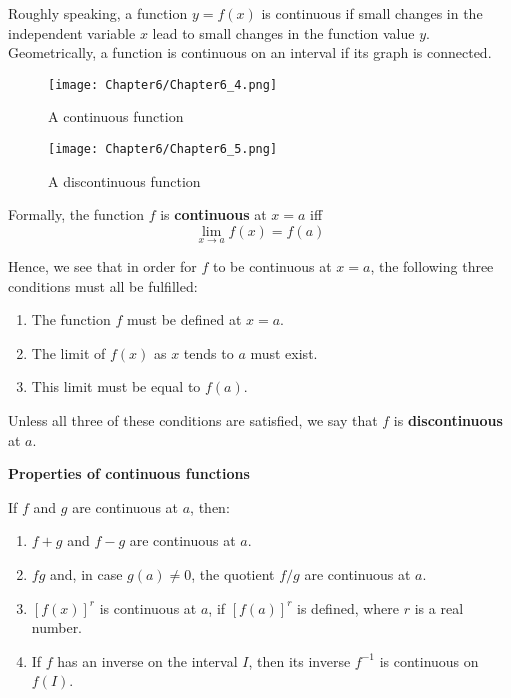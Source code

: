 \documentclass[10pt,a4paper]{book}
\theoremstyle{definition}\newtheorem{definition}{Definition}
\theoremstyle{definition}\newtheorem{fact}{Fact}
\theoremstyle{definition}\newtheorem{ex}{Ex.}
\theoremstyle{definition}\newtheorem{project}{Project}
\theoremstyle{definition}\newtheorem{problem}{Problem}
\theoremstyle{definition}\newtheorem{example}{Example}
\numberwithin{theorem}{chapter}
\numberwithin{corollary}{chapter}
\numberwithin{assumption}{chapter}
\numberwithin{definition}{chapter}
\numberwithin{prop}{chapter}
\numberwithin{notation}{chapter}
\numberwithin{problem}{chapter}
\numberwithin{example}{chapter}
\numberwithin{fact}{chapter}
\numberwithin{ex}{chapter}
\begin{document}
	Roughly speaking, a function $y = f (x)$ is continuous if small changes in the independent variable $x$ lead to small changes in the function value $y$. Geometrically, a function is continuous on an interval if its graph is connected.
	
	\begin{figure}[H]
		\centering
		\texttt{[image: Chapter6/Chapter6\_4.png]}
		\caption{A continuous function}
	\end{figure}
	
	\begin{figure}[H]
		\centering
		\texttt{[image: Chapter6/Chapter6\_5.png]}
		\caption{A discontinuous function}
	\end{figure}
	
	Formally, the function $f$ is \textbf{continuous} at $x = a$ iff
	$$\lim_{x \to a} f(x) = f(a)$$
	
	Hence, we see that in order for $f$ to be continuous at $x = a$, the following three conditions must all be fulfilled:
	\begin{enumerate}[label=(\roman*)]
		\item The function $f$ must be defined at $x = a$.
		\item The limit of $f (x)$ as $x$ tends to $a$ must exist.
		\item This limit must be equal to $f (a)$.
	\end{enumerate}
	
	Unless all three of these conditions are satisfied, we say that $f$ is \textbf{discontinuous} at $a$.
	
	\textbf{Properties of continuous functions}
	
	If $f$ and $g$ are continuous at $a$, then:
	\begin{enumerate}[label=(\alph*)]
		\item $f +g$ and $f-g$ are continuous at $a$.
		\item $fg$ and, in case $g(a) \neq 0$, the quotient $f /g$ are continuous at $a$.
		\item $[f(x)]^r$ is continuous at $a$, if $[f(a)]^r$ is defined, where $r$ is a real number.
		\item If $f$ has an inverse on the interval $I$, then its inverse $f^{-1}$ is continuous on $f(I)$.
	\end{enumerate}
	
\end{document}
